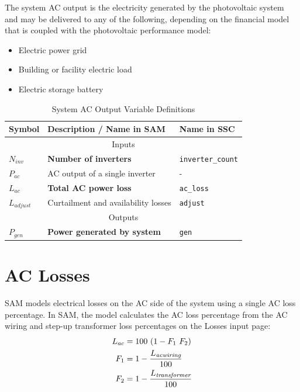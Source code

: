 \documentclass[12pt,letterpaper]{article}
\begin{document}
The system AC output is the electricity generated by the photovoltaic system and may be delivered to any of the following, depending on the financial model that is coupled with the photovoltaic performance model:
\begin{itemize}
\item Electric power grid
\item Building or facility electric load
\item Electric storage battery
\end{itemize}
\begin{table}
\begin{center}
\caption{System AC Output Variable Definitions}
\begin{tabular}{lll}
\midrule
Symbol & Description / \textbf{Name in SAM} & Name in SSC \\
\midrule
\multicolumn{3}{c}{Inputs}\\
$N_{inv}$ & \textbf{Number of inverters} & \texttt{inverter\_count} \\
$P_{ac}$ & AC output of a single inverter & - \\
$L_{ac}$ & \textbf{Total AC power loss} & \texttt{ac\_loss} \\
$L_{\textit{adjust}}$ & Curtailment and availability losses & \texttt{adjust} \\
\midrule
\multicolumn{3}{c}{Outputs}\\
$P_{\textit{gen}}$ & \textbf{Power generated by system} & \texttt{gen} \\
\hline
\end{tabular}
\label{tab-systemacoutputvars}
\end{center}
\end{table}

\section{AC Losses}\label{sec-aclosses}

SAM models electrical losses on the AC side of the system using a single AC loss percentage.  In SAM, the model calculates the AC loss percentage from the AC wiring and step-up transformer loss percentages on the Losses input page:
\begin{align}\label{eqn-acderate}
L_{ac} &= 100~(1-F_1~F_2)\notag\\
F_{1} &= 1-\frac{L_{\textit{acwiring}}}{100} \notag\\
F_{2} &= 1-\frac{L_{\textit{transformer}}}{100}
\end{align}
\end{document}
